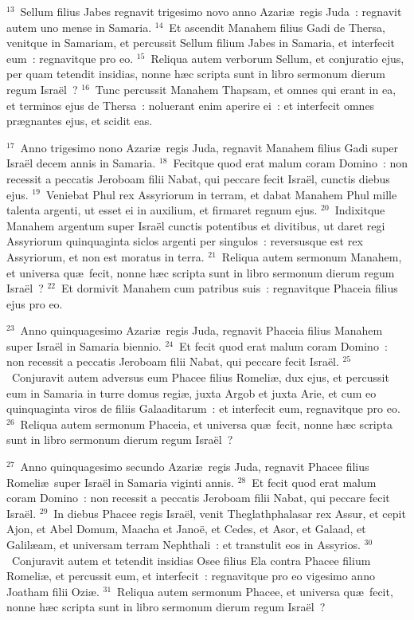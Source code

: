 ${}^{13}$~Sellum filius Jabes regnavit trigesimo novo anno Azari\ae\ regis Juda~: regnavit autem uno mense in Samaria.
${}^{14}$~Et ascendit Manahem filius Gadi de Thersa, venitque in Samariam, et percussit Sellum filium Jabes in Samaria, et interfecit eum~: regnavitque pro eo.
${}^{15}$~Reliqua autem verborum Sellum, et conjuratio ejus, per quam tetendit insidias, nonne h\ae c scripta sunt in libro sermonum dierum regum Isra\"el~?
${}^{16}$~Tunc percussit Manahem Thapsam, et omnes qui erant in ea, et terminos ejus de Thersa~: noluerant enim aperire ei~: et interfecit omnes pr\ae gnantes ejus, et scidit eas.


${}^{17}$~Anno trigesimo nono Azari\ae\ regis Juda, regnavit Manahem filius Gadi super Isra\"el decem annis in Samaria.
${}^{18}$~Fecitque quod erat malum coram Domino~: non recessit a peccatis Jeroboam filii Nabat, qui peccare fecit Isra\"el, cunctis diebus ejus.
${}^{19}$~Veniebat Phul rex Assyriorum in terram, et dabat Manahem Phul mille talenta argenti, ut esset ei in auxilium, et firmaret regnum ejus.
${}^{20}$~Indixitque Manahem argentum super Isra\"el cunctis potentibus et divitibus, ut daret regi Assyriorum quinquaginta siclos argenti per singulos~: reversusque est rex Assyriorum, et non est moratus in terra.
${}^{21}$~Reliqua autem sermonum Manahem, et universa qu\ae\ fecit, nonne h\ae c scripta sunt in libro sermonum dierum regum Isra\"el~?
${}^{22}$~Et dormivit Manahem cum patribus suis~: regnavitque Phaceia filius ejus pro eo.


${}^{23}$~Anno quinquagesimo Azari\ae\ regis Juda, regnavit Phaceia filius Manahem super Isra\"el in Samaria biennio.
${}^{24}$~Et fecit quod erat malum coram Domino~: non recessit a peccatis Jeroboam filii Nabat, qui peccare fecit Isra\"el.
${}^{25}$~Conjuravit autem adversus eum Phacee filius Romeli\ae , dux ejus, et percussit eum in Samaria in turre domus regi\ae , juxta Argob et juxta Arie, et cum eo quinquaginta viros de filiis Galaaditarum~: et interfecit eum, regnavitque pro eo.
${}^{26}$~Reliqua autem sermonum Phaceia, et universa qu\ae\ fecit, nonne h\ae c scripta sunt in libro sermonum dierum regum Isra\"el~?


${}^{27}$~Anno quinquagesimo secundo Azari\ae\ regis Juda, regnavit Phacee filius Romeli\ae\ super Isra\"el in Samaria viginti annis.
${}^{28}$~Et fecit quod erat malum coram Domino~: non recessit a peccatis Jeroboam filii Nabat, qui peccare fecit Isra\"el.
${}^{29}$~In diebus Phacee regis Isra\"el, venit Theglathphalasar rex Assur, et cepit Ajon, et Abel Domum, Maacha et Jano\"e, et Cedes, et Asor, et Galaad, et Galil\ae am, et universam terram Nephthali~: et transtulit eos in Assyrios.
${}^{30}$~Conjuravit autem et tetendit insidias Osee filius Ela contra Phacee filium Romeli\ae , et percussit eum, et interfecit~: regnavitque pro eo vigesimo anno Joatham filii Ozi\ae .
${}^{31}$~Reliqua autem sermonum Phacee, et universa qu\ae\ fecit, nonne h\ae c scripta sunt in libro sermonum dierum regum Isra\"el~?


